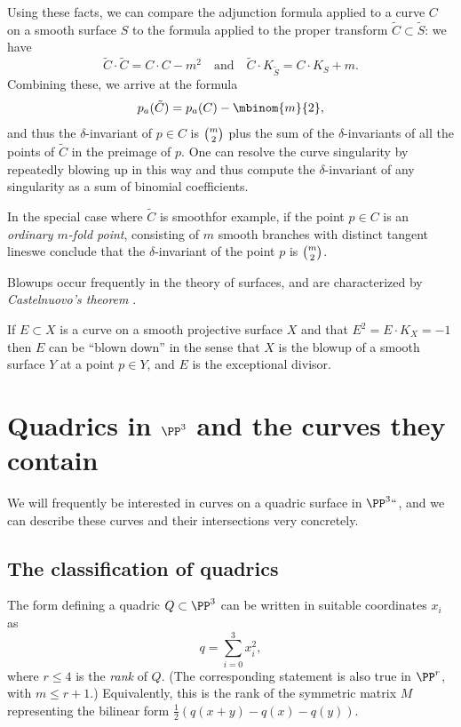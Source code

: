 Using these facts, we can compare the adjunction formula applied to a curve $C$ on a smooth surface $S$ to the formula applied to the proper transform $\tilde C \subset \tilde S$: we have
$$
\tilde C \cdot \tilde C = C \cdot C - m^2 \quad \text{and} \quad \tilde C \cdot K_{\tilde S} = C \cdot K_S + m.
$$
Combining these, we arrive at the formula
$$
p_a(\tilde C) = p_a(C) - \mbinom{m}{2},
$$
and thus the $\delta$-invariant of $p \in C$ is $\tbinom{m}{2}$ plus the sum of the $\delta$-invariants of all the 
points of $\tilde C$ in the preimage of $p$. One can resolve the curve singularity by repeatedly blowing up in this way and thus compute the $\delta$-invariant
of any singularity as a sum of binomial coefficients.

In the special case where $\tilde C$ is smooth\emdash for example, if
the point $p \in C$ is an \emph{ordinary $m$-fold point}, consisting
%
%
of $m$ smooth branches with distinct tangent lines\emdash we conclude
that the $\delta$-invariant of the point $p$ is $\tbinom{m}{2}$. 


Blowups occur frequently in the theory of surfaces, and are
%
characterized by \emph{Castelnuovo's theorem} 
\cite[Theorem V.5.7]{Hartshorne1977}. 

\begin{theorem}
If $E\subset X$ is a curve on a smooth projective surface $X$ and
%
 that $E^2 = E\cdot K_X = -1$ then $E$ can be ``blown down'' in the sense that
 $X$ is the blowup of a smooth surface $Y$ at a point $p\in Y$, and $E$ is the exceptional divisor.
\end{theorem}




\section{Quadrics in $\PP^3$ and the curves they contain}
\label{Div of quadric}
 
 We will frequently be interested in curves on a quadric surface in $\PP^3` `$, and we can describe these
curves and their intersections very concretely.

\subsection*{The classification of quadrics} The form defining a quadric $Q\subset \PP^{3}$ can be written in suitable
%
coordinates $x_{i}$ as 
$$q = \sum_{i=0}^{3} x_{i}^{2},$$ 
where $r\leq 4$ is the \emph{rank} of $Q$. (The corresponding
statement is also true in $\PP^{r}$, with $m\leq r+1$.) Equivalently, this is the rank of the symmetric matrix $M$
representing the bilinear form $\frac12(q(x+y)-q(x)-q(y))$.

